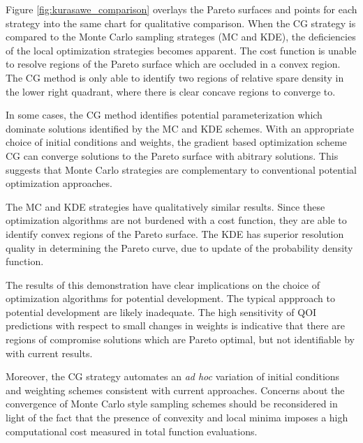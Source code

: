 Figure \ref{fig:kurasawe_comparison} overlays the Pareto surfaces and points for each strategy into the same chart for qualitative comparison.  When the CG strategy is compared to the Monte Carlo sampling strateges (MC and KDE), the deficiencies of the local optimization strategies becomes apparent.  The cost function is unable to resolve regions of the Pareto surface which are occluded in a convex region.  The CG method is only able to identify two regions of relative spare density in the lower right quadrant, where there is clear concave regions to converge to.

In some cases, the CG method identifies potential parameterization which dominate solutions identified by the MC and KDE schemes.  With an appropriate choice of initial conditions and weights, the gradient based optimization scheme CG can converge solutions to the Pareto surface with abitrary solutions.  This suggests that Monte Carlo strategies are complementary to conventional potential optimization approaches.

The MC and KDE strategies have qualitatively similar results.  Since these optimization algorithms are not burdened with a cost function, they are able to identify convex regions of the Pareto surface.  The KDE has superior resolution quality in determining the Pareto curve, due to update of the probability density function.

The results of this demonstration have clear implications on the choice of optimization algorithms for potential development.  The typical appproach to potential development are likely inadequate.  The high sensitivity of QOI predictions with respect to small changes in weights is indicative that there are regions of compromise solutions which are Pareto optimal, but not identifiable by with current results.

Moreover, the CG strategy automates an \emph{ad hoc} variation of initial conditions and weighting schemes consistent with current approaches.  Concerns about the convergence of Monte Carlo style sampling schemes should be reconsidered in light  of the fact that the presence of convexity and local minima imposes a high computational cost measured in total function evaluations.

